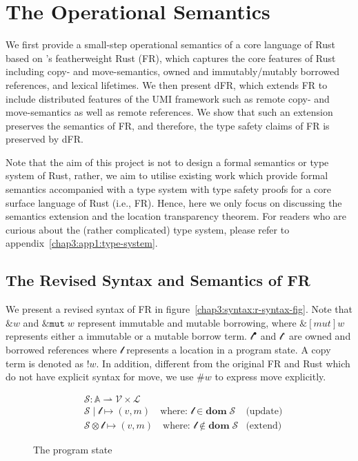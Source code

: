 \section{The Operational Semantics}
\label{chap3:semantics}
We first provide a small-step operational semantics of a core language of Rust based on \citet{10.1145/3443420}'s featherweight Rust (FR), which captures the core features of Rust including copy- and move-semantics, owned and immutably/mutably borrowed references, and lexical lifetimes. We then present dFR, which extends FR to include distributed features of the UMI framework such as remote copy- and move-semantics as well as remote references. We show that such an extension preserves the semantics of FR, and therefore, the type safety claims of FR is preserved by dFR.

Note that the aim of this project is not to design a formal semantics or type system of Rust, rather, we aim to utilise existing work which provide formal semantics accompanied with a type system with type safety proofs for a core surface language of Rust (i.e., FR). Hence, here we only focus on discussing the semantics extension and the location transparency theorem. For readers who are curious about the (rather complicated) type system, please refer to appendix~\ref{chap3:app1:type-system}.

\subsection{The Revised Syntax and Semantics of FR}
\label{chap3:semantics:fr}
We present a revised syntax of FR in figure~\ref{chap3:syntax:r-syntax-fig}. Note that $\&w$ and $\&\texttt{mut}\;w$ represent immutable and mutable borrowing, where $\&[mut] w$ represents either a immutable or a mutable borrow term. $\mathscr{l}^\bullet$ and $\mathscr{l}^\circ$ are owned and borrowed references where $\mathscr{l}$ represents a location in a program state. A copy term is denoted as $!w$. In addition, different from the original FR and Rust which do not have explicit syntax for move, we use $\#w$ to express move explicitly.

\begin{figure}
\begin{align*}
    &\mathcal{S}: \mathbb{A} \rightharpoonup \mathcal{V} \times \mathcal{L}\\
    &\mathcal{S} \mid \mathscr{l} \mapsto (v, m) \quad \text{where: } \mathscr{l} \in \textbf{dom}\;\mathcal{S} &\text{(update)}\\
    &\mathcal{S} \otimes \mathscr{l} \mapsto (v, m) \quad \text{where: } \mathscr{l} \notin \textbf{dom}\;\mathcal{S} &\text{(extend)}
\end{align*}
\caption{The program state}
\label{chap3:semantics:program:state}
\end{figure}

